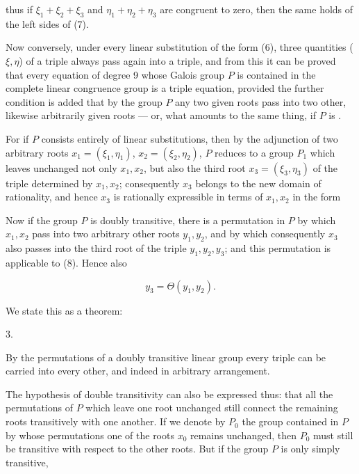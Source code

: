 thus if $\xi_1 + \xi_2 + \xi_3$ and $\eta_1 + \eta_2 + \eta_3$ are congruent to zero,
then the same holds of the left sides of (7).

Now conversely, under every linear substitution of the form (6), three quantities
($\xi, \eta$) of a triple always pass again into a triple, and from this it can be
proved that every equation of degree 9 whose Galois group $P$ is contained in the
complete linear congruence group is a triple equation, provided the further condition
is added that by the group $P$ any two given roots pass into two other, likewise
arbitrarily given roots — or, what amounts to the same thing, if $P$ is
.

For if $P$ consists entirely of linear substitutions, then by the adjunction of two
arbitrary roots $x_1 = (\xi_1, \eta_1)$, $x_2 = (\xi_2, \eta_2)$, $P$ reduces to a
group $P_1$ which leaves unchanged not only $x_1, x_2$, but also the third root
$x_3 = (\xi_3, \eta_3)$ of the triple determined by $x_1, x_2$; consequently $x_3$
belongs to the new domain of rationality, and hence $x_3$ is rationally expressible
in terms of $x_1, x_2$ in the form


Now if the group $P$ is doubly transitive, there is a permutation in $P$ by which
$x_1, x_2$ pass into two arbitrary other roots $y_1, y_2$, and by which consequently
$x_3$ also passes into the third root of the triple $y_1, y_2, y_3$; and this
permutation is applicable to (8). Hence also

\[
y_3 = \Theta (y_1, y_2).
\]

We state this as a theorem:

3. 

By the permutations of a doubly transitive linear group every triple can be carried
into every other, and indeed in arbitrary arrangement.

The hypothesis of double transitivity can also be expressed thus: that all the
permutations of $P$ which leave one root unchanged still connect the remaining roots
transitively with one another. If we denote by $P_0$ the group contained in $P$ by
whose permutations one of the roots $x_0$ remains unchanged, then $P_0$ must still be
transitive with respect to the other roots. But if the group $P$ is only simply
transitive,
